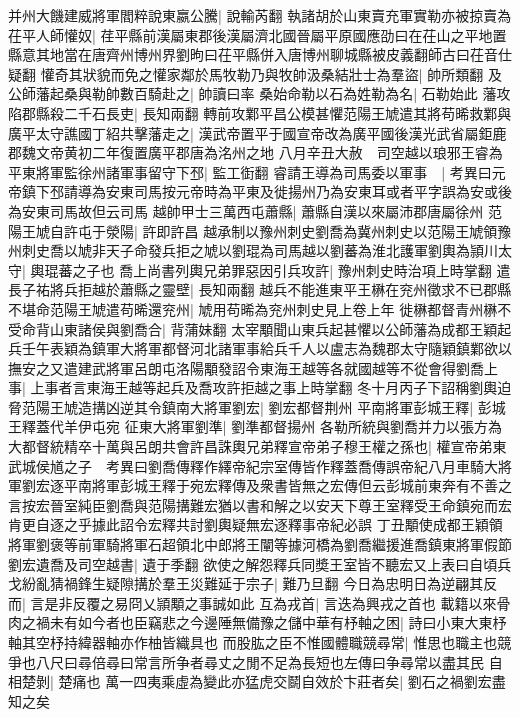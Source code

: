 并州大饑建威將軍閻粹說東嬴公騰|{
	說輸芮翻}
執諸胡於山東賣充軍實勒亦被掠賣為茌平人師懽奴|{
	荏平縣前漢屬東郡後漢屬濟北國晉屬平原國應劭曰在茌山之平地置縣意其地當在唐齊州博州界劉昫曰茌平縣併入唐博州聊城縣被皮義翻師古曰茌音仕疑翻}
懽奇其狀貌而免之懽家鄰於馬牧勒乃與牧帥汲桑結壯士為羣盜|{
	帥所類翻}
及公師藩起桑與勒帥數百騎赴之|{
	帥讀曰率}
桑始命勒以石為姓勒為名|{
	石勒始此}
藩攻陷郡縣殺二千石長吏|{
	長知兩翻}
轉前攻鄴平昌公模甚懼范陽王虓遣其將苟晞救鄴與廣平太守譙國丁紹共擊藩走之|{
	漢武帝置平于國宣帝改為廣平國後漢光武省屬鉅鹿郡魏文帝黄初二年復置廣平郡唐為洺州之地}
八月辛丑大赦　司空越以琅邪王睿為平東將軍監徐州諸軍事留守下邳|{
	監工衘翻}
睿請王導為司馬委以軍事　|{
	考異曰元帝鎮下邳請導為安東司馬按元帝時為平東及徙揚州乃為安東耳或者平字誤為安或後為安東司馬故但云司馬}
越帥甲士三萬西屯蕭縣|{
	蕭縣自漢以來屬沛郡唐屬徐州}
范陽王虓自許屯于滎陽|{
	許即許昌}
越承制以豫州刺史劉喬為冀州刺史以范陽王虓領豫州刺史喬以虓非天子命發兵拒之虓以劉琨為司馬越以劉蕃為淮北護軍劉輿為頴川太守|{
	輿琨蕃之子也}
喬上尚書列輿兄弟罪惡因引兵攻許|{
	豫州刺史時治項上時掌翻}
遣長子祐將兵拒越於蕭縣之靈壁|{
	長知兩翻}
越兵不能進東平王楙在兖州徵求不已郡縣不堪命范陽王虓遣苟晞還兖州|{
	虓用苟晞為兖州刺史見上卷上年}
徙楙都督青州楙不受命背山東諸侯與劉喬合|{
	背蒲妹翻}
太宰顒聞山東兵起甚懼以公師藩為成都王穎起兵壬午表穎為鎮軍大將軍都督河北諸軍事給兵千人以盧志為魏郡太守隨穎鎮鄴欲以撫安之又遣建武將軍呂朗屯洛陽顒發詔令東海王越等各就國越等不從會得劉喬上事|{
	上事者言東海王越等起兵及喬攻許拒越之事上時掌翻}
冬十月丙子下詔稱劉輿迫脅范陽王虓造搆凶逆其令鎮南大將軍劉宏|{
	劉宏都督荆州}
平南將軍彭城王釋|{
	彭城王釋蓋代羊伊屯宛}
征東大將軍劉準|{
	劉準都督揚州}
各勒所統與劉喬并力以張方為大都督統精卒十萬與呂朗共會許昌誅輿兄弟釋宣帝弟子穆王權之孫也|{
	權宣帝弟東武城侯馗之子　考異曰劉喬傳釋作繹帝紀宗室傳皆作釋蓋喬傳誤帝紀八月車騎大將軍劉宏逐平南將軍彭城王釋于宛宏釋傳及衆書皆無之宏傳但云彭城前東奔有不善之言按宏晉室純臣劉喬與范陽搆難宏猶以書和解之以安天下尊王室釋受王命鎮宛而宏肯更自逐之乎據此詔令宏釋共討劉輿疑無宏逐釋事帝紀必誤}
丁丑顒使成都王穎領將軍劉褒等前軍騎將軍石超領北中郎將王闡等據河橋為劉喬繼援進喬鎮東將軍假節劉宏遺喬及司空越書|{
	遺于季翻}
欲使之解怨釋兵同奬王室皆不聽宏又上表曰自頃兵戈紛亂猜禍鋒生疑隙搆於羣王災難延于宗子|{
	難乃旦翻}
今日為忠明日為逆翩其反而|{
	言是非反覆之易冏乂頴顒之事誠如此}
互為戎首|{
	言迭為興戎之首也}
載籍以來骨肉之禍未有如今者也臣竊悲之今邊陲無備豫之儲中華有杼軸之困|{
	詩曰小東大東杼軸其空杼持緯器軸亦作柚皆織具也}
而股肱之臣不惟國體職競尋常|{
	惟思也職主也競爭也八尺曰尋倍尋曰常言所争者尋丈之閒不足為長短也左傳曰争尋常以盡其民}
自相楚剝|{
	楚痛也}
萬一四夷乘虛為變此亦猛虎交鬬自效於卞莊者矣|{
	劉石之禍劉宏盡知之矣}
